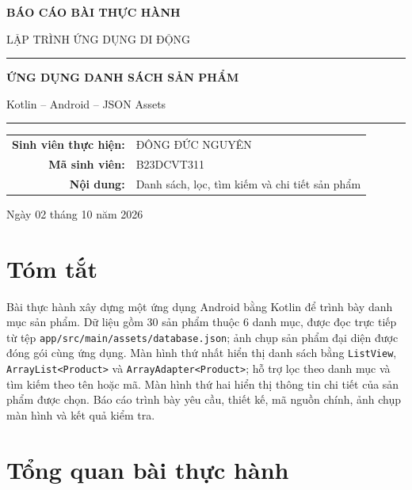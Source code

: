 \documentclass[12pt,a4paper]{article}
\newcommand{\codepath}[1]{\nolinkurl{#1}}
\begin{document}
\hypersetup{pageanchor=false}
\begin{titlepage}
\centering
\vspace*{1.4cm}
{\Large\bfseries BÁO CÁO BÀI THỰC HÀNH\par}
\vspace{0.35cm}
{\Large LẬP TRÌNH ỨNG DỤNG DI ĐỘNG\par}
\vspace{1.6cm}
{\color{accentblue}\rule{0.82\textwidth}{1.2pt}\par}
\vspace{0.45cm}
{\Huge\bfseries ỨNG DỤNG DANH SÁCH SẢN PHẨM\par}
\vspace{0.45cm}
{\large Kotlin -- Android -- JSON Assets\par}
\vspace{0.45cm}
{\color{accentblue}\rule{0.82\textwidth}{1.2pt}\par}
\vspace{2.2cm}
\begin{tabular}{rl}
\textbf{Sinh viên thực hiện:} & ĐÔNG ĐỨC NGUYÊN\\[0.25cm]
\textbf{Mã sinh viên:} & B23DCVT311\\[0.25cm]
\textbf{Nội dung:} & Danh sách, lọc, tìm kiếm và chi tiết sản phẩm
\end{tabular}
\vfill
{\large Ngày 02 tháng 10 năm 2026\par}
\end{titlepage}

\hypersetup{pageanchor=true}
\section*{Tóm tắt}
Bài thực hành xây dựng một ứng dụng Android bằng Kotlin để trình bày danh mục sản phẩm.
Dữ liệu gồm 30 sản phẩm thuộc 6 danh mục, được đọc trực tiếp từ tệp
\codepath{app/src/main/assets/database.json}; ảnh chụp sản phẩm đại diện được đóng gói cùng ứng dụng.
Màn hình thứ nhất hiển thị danh sách bằng \texttt{ListView}, \texttt{ArrayList<Product>}
và \texttt{ArrayAdapter<Product>}; hỗ trợ lọc theo danh mục và tìm kiếm theo tên hoặc mã.
Màn hình thứ hai hiển thị thông tin chi tiết của sản phẩm được chọn.
Báo cáo trình bày yêu cầu, thiết kế, mã nguồn chính, ảnh chụp màn hình và kết quả kiểm tra.
\tableofcontents
\clearpage
{}

\section{Tổng quan bài thực hành}
\end{document}
